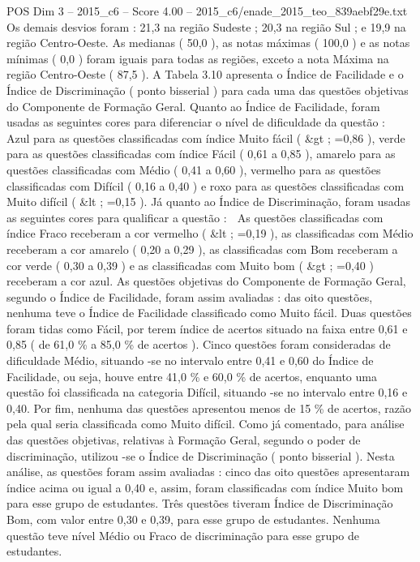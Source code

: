 \begin{textsample}{POS Dim 3 – 2015\_c6 – Score 4.00 – 2015\_c6/enade\_2015\_teo\_839aebf29e.txt}
Os demais desvios foram : 21,3 na região Sudeste ; 20,3 na região Sul ; e 19,9 na região Centro-Oeste.
As medianas ( 50,0 ), as notas máximas ( 100,0 ) e as notas mínimas ( 0,0 ) foram iguais para todas as regiões, exceto a nota Máxima na região Centro-Oeste ( 87,5 ).
A Tabela 3.10 apresenta o Índice de Facilidade e o Índice de Discriminação ( ponto bisserial ) para cada uma das questões objetivas do Componente de Formação Geral.
Quanto ao Índice de Facilidade, foram usadas as seguintes cores para diferenciar o nível de dificuldade da questão :  Azul para as questões classificadas com índice Muito fácil ( \&gt ; =0,86 ), verde para as questões classificadas com índice Fácil ( 0,61 a 0,85 ), amarelo para as questões classificadas com Médio ( 0,41 a 0,60 ), vermelho para as questões classificadas com Difícil ( 0,16 a 0,40 ) e roxo para as questões classificadas com Muito difícil ( \&lt ; =0,15 ).
Já quanto ao Índice de Discriminação, foram usadas as seguintes cores para qualificar a questão :  As questões classificadas com índice Fraco receberam a cor vermelho ( \&lt ; =0,19 ), as classificadas com Médio receberam a cor amarelo ( 0,20 a 0,29 ), as classificadas com Bom receberam a cor verde ( 0,30 a 0,39 ) e as classificadas com Muito bom ( \&gt ; =0,40 ) receberam a cor azul.
As questões objetivas do Componente de Formação Geral, segundo o Índice de Facilidade, foram assim avaliadas : das oito questões, nenhuma teve o Índice de Facilidade classificado como Muito fácil.
Duas questões foram tidas como Fácil, por terem índice de acertos situado na faixa entre 0,61 e 0,85 ( de 61,0 \% a 85,0 \% de acertos ).
Cinco questões foram consideradas de dificuldade Médio, situando -se no intervalo entre 0,41 e 0,60 do Índice de Facilidade, ou seja, houve entre 41,0 \% e 60,0 \% de acertos, enquanto uma questão foi classificada na categoria Difícil, situando -se no intervalo entre 0,16 e 0,40.
Por fim, nenhuma das questões apresentou menos de 15 \% de acertos, razão pela qual seria classificada como Muito difícil.
Como já comentado, para análise das questões objetivas, relativas à Formação Geral, segundo o poder de discriminação, utilizou -se o Índice de Discriminação ( ponto bisserial ).
Nesta análise, as questões foram assim avaliadas : cinco das oito questões apresentaram índice acima ou igual a 0,40 e, assim, foram classificadas com índice Muito bom para esse grupo de estudantes.
Três questões tiveram Índice de Discriminação Bom, com valor entre 0,30 e 0,39, para esse grupo de estudantes.
Nenhuma questão teve nível Médio ou Fraco de discriminação para esse grupo de estudantes.

\end{textsample}
